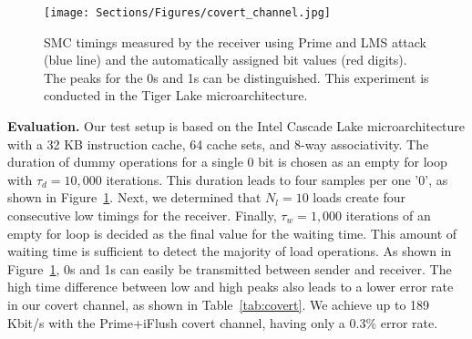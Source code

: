 \begin{figure}[t!]
    \centering
    \texttt{[image: Sections/Figures/covert\_channel.jpg]}
    \caption{SMC timings measured by the receiver using Prime and LMS attack (blue line) and the automatically assigned bit values (red digits). The peaks for the 0s and 1s can be distinguished. This experiment is conducted in the Tiger Lake microarchitecture.}
    \label{fig:covert}
    
\end{figure}

\noindent\textbf{Evaluation.} Our test setup is based on the Intel Cascade Lake microarchitecture with a 32 KB instruction cache, 64 cache sets, and 8-way associativity. 
The duration of dummy operations for a single 0 bit is chosen as an empty for loop with $\tau_{d} = 10,000$ iterations. This duration leads to four samples per one '0', as shown in Figure~\ref{fig:covert}. 
Next, we determined that $N_l = 10$ loads create four consecutive low timings for the receiver. 
Finally, $\tau_{w} = 1,000$ iterations of an empty for loop is decided as the final value for the waiting time. This amount of waiting time is sufficient to detect the majority of load operations. As shown in Figure~\ref{fig:covert}, 0s and 1s can easily be transmitted between sender and receiver. The high time difference between low and high peaks also leads to a lower error rate in our covert channel, as shown in Table~\ref{tab:covert}. We achieve up to 189 Kbit/s with the Prime+iFlush covert channel, having only a 0.3\% error rate.

